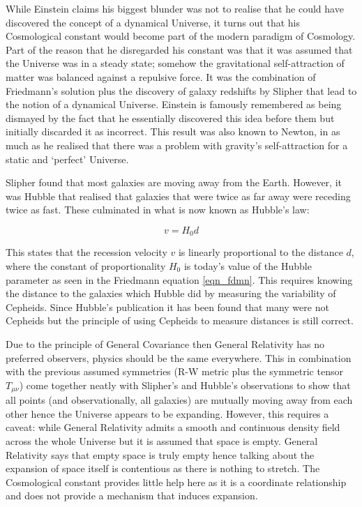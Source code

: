 While Einstein claims his biggest blunder was not to realise that he could have discovered the concept of a dynamical Universe, it turns out that his Cosmological constant would become part of the modern paradigm of Cosmology. Part of the reason that he disregarded his constant was that it was assumed that the Universe was in a steady state; somehow the gravitational self-attraction of matter was balanced against a repulsive force. It was the combination of Friedmann's solution plus the discovery of galaxy redshifts by Slipher \citep{bib_sli} that lead to the notion of a dynamical Universe. Einstein is famously remembered as being dismayed by the fact that he essentially discovered this idea before them but initially discarded it as incorrect. This result was also known to Newton, in as much as he realised that there was a problem with gravity's self-attraction for a static and `perfect' Universe.

Slipher found that most galaxies are moving away from the Earth. However, it was Hubble \citep{bib_hub} that realised that galaxies that were twice as far away were receding twice as fast. These culminated in what is now known as Hubble's law:

\begin{equation}
 v = H_0 d 
\end{equation}

\noindent This states that the recession velocity $v$ is linearly proportional to the distance $d$, where the constant of proportionality $H_0$ is today's value of the Hubble parameter as seen in the Friedmann equation \ref{eqn_fdmn}. This requires knowing the distance to the galaxies which Hubble did by measuring the variability of Cepheids. Since Hubble's publication it has been found that many were not Cepheids but the principle of using Cepheids to measure distances is still correct.

Due to the principle of General Covariance then General Relativity has no preferred observers, physics should be the same everywhere. This in combination with the previous assumed symmetries (R-W metric plus the symmetric tensor $T_{\mu\nu}$) come together neatly with Slipher's and Hubble's observations to show that all points (and observationally, all galaxies) are mutually moving away from each other hence the Universe appears to be expanding. However, this requires a caveat: while General Relativity admits a smooth and continuous density field across the whole Universe but it is assumed that space is empty. General Relativity says that empty space is truly empty hence talking about the expansion of space itself is contentious as there is nothing to stretch. The Cosmological constant provides little help here as it is a coordinate relationship and does not provide a mechanism that induces expansion.

